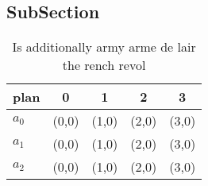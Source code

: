 \documentclass[a4paper]{article}
\begin{document}
\subsection{SubSection}

\begin{table}
\begin{adjustbox}{width=0.6\columnwidth}
\begin{tabular}{|l|l|l|l|l|}
\hline
\textbf{plan} & \multicolumn{1}{c|}{\textbf{0}} & \multicolumn{1}{c|}{\textbf{1}} & \multicolumn{1}{c|}{\textbf{2}} & \multicolumn{1}{c|}{\textbf{3}} \\ \hline
\textbf{$a_0$}  & (0,0) & (1,0) & (2,0) & (3,0) \\ \hline
\textbf{$a_1$}  & (0,0) & (1,0) & (2,0) & (3,0) \\ \hline
\textbf{$a_2$}  & (0,0) & (1,0) & (2,0) & (3,0) \\ \hline
\end{tabular}
\end{adjustbox}
\caption{Is additionally army arme de lair the rench revol
}
\end{table}
\end{document}
